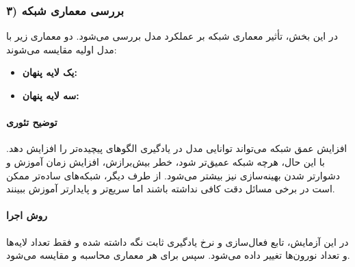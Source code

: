 \documentclass[12pt,a4paper]{article}
\begin{document}
\subsubsection{۳) بررسی معماری شبکه}

در این بخش، تأثیر معماری شبکه بر عملکرد مدل بررسی می‌شود.  
دو معماری زیر با مدل اولیه مقایسه می‌شوند:

\begin{itemize}
	\item \textbf{یک لایه پنهان: }
	\item \textbf{سه لایه پنهان: }
\end{itemize}

\paragraph{توضیح تئوری}
افزایش عمق شبکه می‌تواند توانایی مدل در یادگیری الگوهای پیچیده‌تر را افزایش دهد.  
با این حال، هرچه شبکه عمیق‌تر شود، خطر بیش‌برازش، افزایش زمان آموزش و دشوارتر شدن بهینه‌سازی نیز بیشتر می‌شود.  
از طرف دیگر، شبکه‌های ساده‌تر ممکن است در برخی مسائل دقت کافی نداشته باشند اما سریع‌تر و پایدارتر آموزش ببینند.

\paragraph{روش اجرا}
در این آزمایش، تابع فعال‌سازی و نرخ یادگیری ثابت نگه داشته شده و فقط تعداد لایه‌ها و تعداد نورون‌ها تغییر داده می‌شود.  
سپس  برای هر معماری محاسبه و مقایسه می‌شود.
\end{document}
